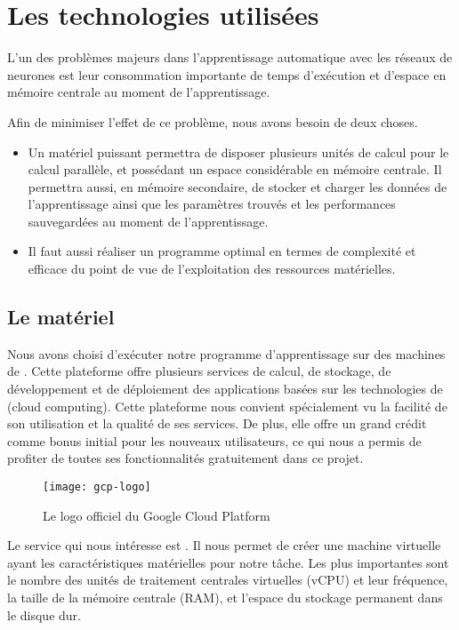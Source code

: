 \section{Les technologies utilisées}

L'un des problèmes majeurs dans l'apprentissage automatique avec les réseaux
de neurones est leur consommation importante de temps d'exécution et d'espace
en mémoire centrale au moment de l'apprentissage.

Afin de minimiser l'effet de ce problème, nous avons besoin de deux choses.

\begin{itemize}
  \item Un matériel puissant permettra de disposer plusieurs unités de calcul
  pour le calcul parallèle, et possédant un espace considérable en mémoire
  centrale. Il permettra aussi, en mémoire secondaire, de stocker et charger les
  données de l'apprentissage ainsi que les paramètres trouvés et les performances
  sauvegardées au moment de l'apprentissage.
  \item Il faut aussi réaliser un programme optimal en termes de complexité et efficace du
  point de vue de l'exploitation des ressources matérielles.
\end{itemize}

\subsection{Le matériel}

Nous avons choisi d'exécuter notre programme d'apprentissage sur des machines de
. Cette plateforme offre plusieurs services de calcul, de stockage,
de développement et de déploiement des applications basées sur les technologies
de  (cloud computing). Cette plateforme nous convient spécialement vu la facilité
de son utilisation et la qualité de ses services. De plus, elle offre un grand crédit
comme bonus initial pour les nouveaux utilisateurs, ce qui nous a permis de profiter de toutes ses
fonctionnalités gratuitement dans ce projet.

\begin{figure}[h]
  \centering
  \texttt{[image: gcp-logo]}
  \caption[Le logo officiel du Google Cloud Platform]{Le logo officiel du Google Cloud Platform~\cite{gcp}}
\end{figure}

Le service qui nous intéresse est . Il nous permet de
créer une machine virtuelle ayant les caractéristiques matérielles pour notre tâche.
Les plus importantes sont le nombre des unités de traitement
centrales virtuelles (vCPU) et leur fréquence, la taille de la mémoire centrale
(RAM), et l'espace du stockage permanent dans le disque dur.

